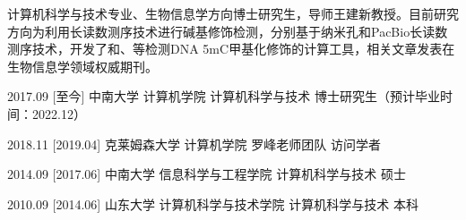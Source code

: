 \documentclass[zh]{resume}
\begin{document}
\makeheader

{\onehalfspacing\hspace{2em}%
计算机科学与技术专业、生物信息学方向博士研究生，导师王建新教授。目前研究方向为利用长读数测序技术进行碱基修饰检测，分别基于纳米孔和PacBio长读数测序技术，开发了和、等检测DNA 5mC甲基化修饰的计算工具，相关文章发表在生物信息学领域权威期刊。
\par}

\begin{competences}
\end{competences}

\begin{educations}
  \education%
    {2017.09}%
    [至今]%
    {中南大学}%
    {计算机学院}%
    {计算机科学与技术}%
    {博士研究生（预计毕业时间：2022.12）}

  \separator{0.5ex}
  \education%
    {2018.11}%
    [2019.04]%
    {克莱姆森大学}%
    {计算机学院}%
    {罗峰老师团队}%
    {访问学者}

  \separator{0.5ex}
  \education%
    {2014.09}%
    [2017.06]%
    {中南大学}%
    {信息科学与工程学院}%
    {计算机科学与技术}%
    {硕士}

  \separator{0.5ex}
  \education%
    {2010.09}%
    [2014.06]%
    {山东大学}%
    {计算机科学与技术学院}%
    {计算机科学与技术}%
    {本科}
\end{educations}

\end{document}

